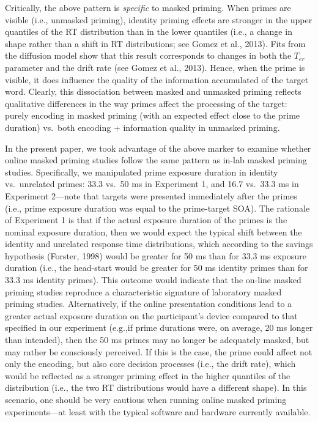 \documentclass[
  english,
  man,floatsintext]{apa6}
\begin{document}
Critically, the above pattern is \emph{specific} to masked priming. When primes are visible (i.e., unmasked priming), identity priming effects are stronger in the upper quantiles of the RT distribution than in the lower quantiles (i.e., a change in shape rather than a shift in RT distributions; see Gomez et al., 2013). Fits from the diffusion model show that this result corresponds to changes in both the \(T_{er}\) parameter and the drift rate (see Gomez et al., 2013). Hence, when the prime is visible, it does influence the quality of the information accumulated of the target word. Clearly, this dissociation between masked and unmasked priming reflects qualitative differences in the way primes affect the processing of the target: purely encoding in masked priming (with an expected effect close to the prime duration) vs.~both encoding + information quality in unmasked priming.

In the present paper, we took advantage of the above marker to examine whether online masked priming studies follow the same pattern as in-lab masked priming studies. Specifically, we manipulated prime exposure duration in identity vs.~unrelated primes: 33.3 vs.~50 ms in Experiment 1, and 16.7 vs.~33.3 ms in Experiment 2---note that targets were presented immediately after the primes (i.e., prime exposure duration was equal to the prime-target SOA). The rationale of Experiment 1 is that if the actual exposure duration of the primes is the nominal exposure duration, then we would expect the typical shift between the identity and unrelated response time distributions, which according to the savings hypothesis (Forster, 1998) would be greater for 50 ms than for 33.3 ms exposure duration (i.e., the head-start would be greater for 50 ms identity primes than for 33.3 ms identity primes). This outcome would indicate that the on-line masked priming studies reproduce a characteristic signature of laboratory masked priming studies. Alternatively, if the online presentation conditions lead to a greater actual exposure duration on the participant's device compared to that specified in our experiment (e.g.,if prime durations were, on average, 20 ms longer than intended), then the 50 ms primes may no longer be adequately masked, but may rather be consciously perceived. If this is the case, the prime could affect not only the encoding, but also core decision processes (i.e., the drift rate), which would be reflected as a stronger priming effect in the higher quantiles of the distribution (i.e., the two RT distributions would have a different shape). In this scenario, one should be very cautious when running online masked priming experiments---at least with the typical software and hardware currently available.
\end{document}
